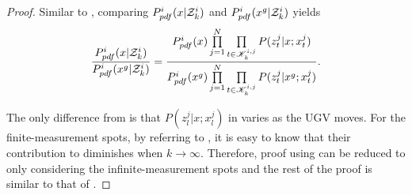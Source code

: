 	\begin{proof}		
		Similar to , comparing $P^i_{pdf}(x|\mathcal{Z}^i_k)$ and $P^i_{pdf}(x^g|\mathcal{Z}^i_k)$ yields		
		\small\begin{equation}\label{eqn:cmp2}
		\frac{P^i_{pdf}(x|\mathcal{Z}^i_k)}{P^i_{pdf}(x^g|\mathcal{Z}^i_k)}=\frac{P^i_{pdf}(x)\prod\limits_{j=1}^{N}\prod\limits_{t\in\mathscr{K}^{i,j}_{k}}P(z^j_t|x;x^j_t)}{P^i_{pdf}(x^g)\prod\limits_{j=1}^{N}\prod\limits_{t\in\mathscr{K}^{i,j}_{k}}P(z^j_t|x^g;x^j_t)}.
		\end{equation}\normalsize
			
		The only difference from  is that $P(z^j_l|x;x^j_l)$ in  varies as the UGV moves.
		For the finite-measurement spots, by referring to , it is easy to know that their contribution to  diminishes when $k\rightarrow \infty$.
		Therefore, proof using  can be reduced to only considering the infinite-measurement spots and the rest of the proof is similar to that of .
	\end{proof}
			
